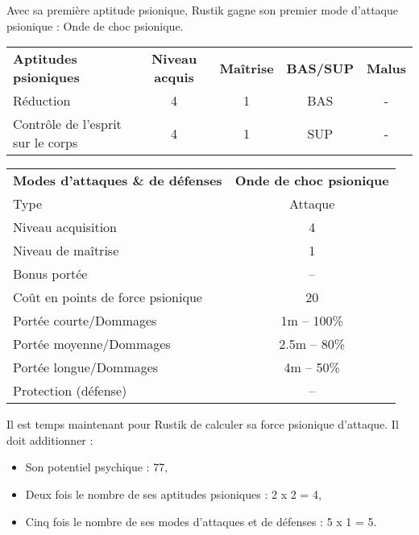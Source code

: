 \bigskip

Avec sa première aptitude psionique, Rustik gagne son premier mode d'attaque psionique : Onde de choc psionique.

\bigskip

\begin{tabular}{lcccc}
\textbf{Aptitudes psioniques} & \textbf{Niveau acquis} & \textbf{Maîtrise}  & \textbf{BAS/SUP} & \textbf{Malus} \\
Réduction                         & 4 & 1 & BAS & - \\
Contrôle de l'esprit sur le corps & 4 & 1 & SUP & - \\
\end{tabular}

\bigskip

\begin{tabular}{lc}
\textbf{Modes d'attaques \& de défenses} & \textbf{Onde de choc psionique} \\
Type                                & Attaque \\
Niveau acquisition                  & 4 \\
Niveau de maîtrise                  & 1 \\
Bonus portée                        & -- \\
Coût en points de force psionique   & 20 \\
Portée courte/Dommages              &   1m -- 100\% \\
Portée moyenne/Dommages             & 2.5m -- 80\% \\
Portée longue/Dommages              &   4m -- 50\%  \\
Protection (défense)                & -- \\
\end{tabular}

\bigskip

Il est temps maintenant pour Rustik de calculer sa force psionique d'attaque. Il doit additionner :

\bigskip

\begin{itemize}
\item Son potentiel psychique : 77,
\item Deux fois le nombre de ses aptitudes psioniques : 2 x 2 = 4,
\item Cinq fois le nombre de ses modes d'attaques et de défenses : 5 x 1 = 5.
\end{itemize}

\bigskip


